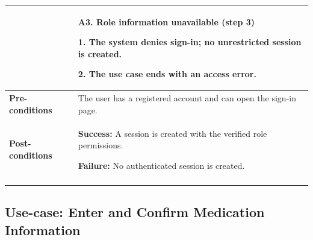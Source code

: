 \begin{longtable}{|p{}|p{}|}
{\begin{tabular}{|p{}|p{}|}
\textbf{Alternative Flows} &
\textbf{A3. Role information unavailable (step 3)}\par
1. The system denies sign-in; no unrestricted session is created.\par
2. The use case ends with an access error.
\\ \hline
\textbf{Pre-conditions} & The user has a registered account and can open the sign-in page. \\ \hline
\textbf{Post-conditions} & \textbf{Success:} A session is created with the verified role permissions.\par
\textbf{Failure:} No authenticated session is created. \\ \hline
\end{tabular}}\\
\end{longtable}


\clearpage
\subsection{Use-case: Enter and Confirm Medication Information}
\label{uc:uc-02}

